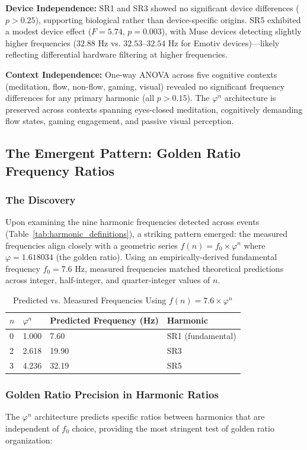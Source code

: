 \documentclass[11pt,a4paper]{article}
\newcommand{\phisym}{\varphi}
\begin{document}
\textbf{Device Independence:} SR1 and SR3 showed no significant device differences ($p > 0.25$), supporting biological rather than device-specific origins. SR5 exhibited a modest device effect ($F = 5.74$, $p = 0.003$), with Muse devices detecting slightly higher frequencies ($32.88$ Hz vs. $32.53$--$32.54$ Hz for Emotiv devices)---likely reflecting differential hardware filtering at higher frequencies.

\textbf{Context Independence:} One-way ANOVA across five cognitive contexts (meditation, flow, non-flow, gaming, visual) revealed no significant frequency differences for any primary harmonic (all $p > 0.15$). The $\phisym^n$ architecture is preserved across contexts spanning eyes-closed meditation, cognitively demanding flow states, gaming engagement, and passive visual perception.

\subsection{The Emergent Pattern: Golden Ratio Frequency Ratios}

\subsubsection{The Discovery}
Upon examining the nine harmonic frequencies detected across events (Table~\ref{tab:harmonic_definitions}), a striking pattern emerged: the measured frequencies align closely with a geometric series $f(n) = f_0 \times \phisym^n$ where $\phisym = 1.618034$ (the golden ratio). Using an empirically-derived fundamental frequency $f_0 = 7.6$ Hz, measured frequencies matched theoretical predictions across integer, half-integer, and quarter-integer values of $n$.

\begin{table}[H]
\centering
\caption{Predicted vs. Measured Frequencies Using $f(n) = 7.6 \times \phisym^n$}
\label{tab:phi_predictions}
\begin{tabular}{llll}
\toprule
$n$ & $\phisym^n$ & Predicted Frequency (Hz) & Harmonic \\
\midrule
0 & 1.000 & 7.60 & SR1 (fundamental) \\
2 & 2.618 & 19.90 & SR3 \\
3 & 4.236 & 32.19 & SR5 \\
\bottomrule
\end{tabular}
\end{table}

\subsubsection{Golden Ratio Precision in Harmonic Ratios}
The $\phisym^n$ architecture predicts specific ratios between harmonics that are independent of $f_0$ choice, providing the most stringent test of golden ratio organization:
\end{document}
